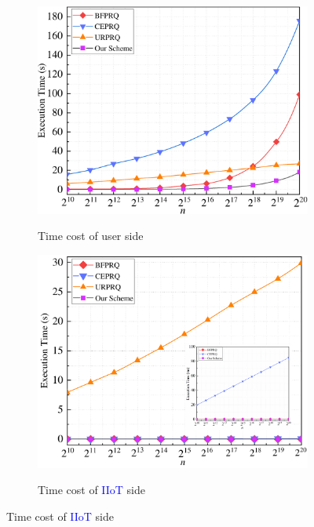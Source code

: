 \documentclass[IEEE JOURNAL OF BIOMEDICAL AND HEALTH INFORMATICS]{IEEEtran}
\begin{document}
{\begin{figure}
	\setlength{\abovecaptionskip}{0.cm}	
	\centering
	\begin{subfigure}[t]{0.3\textwidth}
		\centering	
		\includegraphics[width=1\textwidth]{com_1n}\\
		\caption{Time cost of user side}
		\label{com_1n}
	\end{subfigure}
	\quad
	\begin{subfigure}[t]{0.3\textwidth}
		\centering
		\includegraphics[width=1\textwidth]{com_2n_12}\\
		\caption{Time cost of \textcolor{blue}{IIoT} side}
		\label{com_2n}
	\end{subfigure}

\end{figure}}
\end{document}
